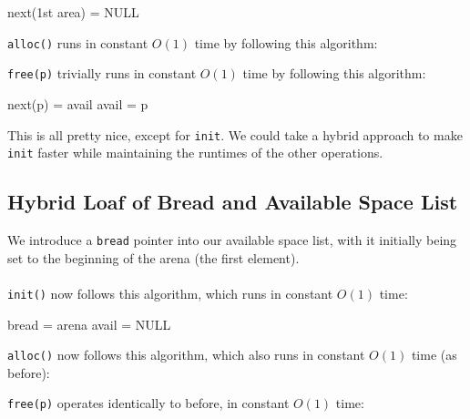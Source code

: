 \documentclass[]{article}
\theoremstyle{definition}
\begin{document}
			\begin{algorithm}[H]
				next(1st area) = NULL\;
			\end{algorithm}

			\verb+alloc()+ runs in constant $O(1)$ time by following this algorithm:

			\begin{algorithm}[H]
			\end{algorithm}

			\verb+free(p)+ trivially runs in constant $O(1)$ time by following this algorithm:
			
			\begin{algorithm}[H]
				next(p) = avail\;
				avail = p\;
			\end{algorithm}

			This is all pretty nice, except for \verb+init+. We could take a hybrid approach to make \verb+init+ faster while maintaining the runtimes of the other operations.

		\subsection{Hybrid Loaf of Bread and Available Space List}
			We introduce a \verb+bread+ pointer into our available space list, with it initially being set to the beginning of the arena (the first element).
			\\ \\
			\verb+init()+ now follows this algorithm, which runs in constant $O(1)$ time:

			\begin{algorithm}[H]
				bread = arena\;
				avail = NULL\;
			\end{algorithm}

			\verb+alloc()+ now follows this algorithm, which also runs in constant $O(1)$ time (as before):
			
			\begin{algorithm}[H]
			\end{algorithm}

			\verb+free(p)+ operates identically to before, in constant $O(1)$ time:
\end{document}

